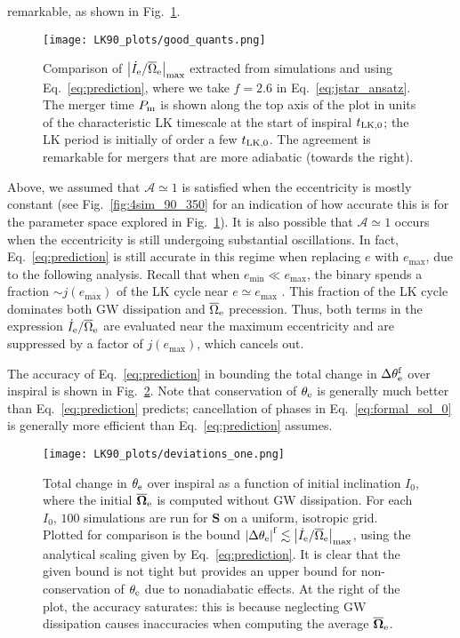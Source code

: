\documentclass[
        twocolumn,
        twocolappendix
    ]{aastex63}
\newcommand*{\abs}[1]{\left|#1\right|}
\renewcommand*{\bm}[1]{\boldsymbol{\mathbf{#1}}}
\begin{document}
remarkable, as shown in Fig.~\ref{fig:good_quants}.
\begin{figure}
    \centering
    \texttt{[image: LK90\_plots/good\_quants.png]}
    \caption{Comparison of $\abs{\dot{I}_{\rm e} /
    \overline{\Omega}_{\rm e}}_{\max}$ extracted from simulations and using
    Eq.~\eqref{eq:prediction}, where we take $f = 2.6$ in
    Eq.~\eqref{eq:jstar_ansatz}. The merger time $P_{\rm m}$ is shown along the
    top axis of the plot in units of the characteristic LK timescale at the
    start of inspiral $t_{\rm LK, 0}$; the LK period is initially of order a few
    $t_{\rm LK, 0}$. The agreement is remarkable for mergers that are more
    adiabatic (towards the right).}\label{fig:good_quants}
\end{figure}

Above, we assumed that $\mathcal{A} \simeq 1$ is satisfied when the eccentricity
is mostly constant (see Fig.~\ref{fig:4sim_90_350} for an indication of how
accurate this is for the parameter space explored in
Fig.~\ref{fig:good_quants}). It is also possible that $\mathcal{A} \simeq 1$
occurs when the eccentricity is still undergoing substantial oscillations. In
fact, Eq.~\eqref{eq:prediction} is still accurate in this regime when replacing
$e$ with $e_{\max}$, due to the following analysis. Recall that when $e_{\min}
\ll e_{\max}$, the binary spends a fraction $\sim j(e_{\max})$ of the LK cycle
near $e \simeq e_{\max}$ \citep{anderson2016formation}. This fraction of the LK
cycle dominates both GW dissipation and $\overline{\Omega}_{\rm e}$ precession.
Thus, both terms in the expression $\dot{I}_{\rm e} / \overline{\Omega}_{\rm e}$
are evaluated near the maximum eccentricity and are suppressed by a factor
of $j(e_{\max})$, which cancels out.

The accuracy of Eq.~\eqref{eq:prediction} in bounding the total change in
$\Delta \theta_{\rm e}^{\rm f}$ over inspiral is shown in
Fig.~\ref{fig:deviations}. Note that conservation of $\theta_{\rm e}$ is
generally much better than Eq.~\eqref{eq:prediction} predicts; cancellation of
phases in Eq.~\eqref{eq:formal_sol_0} is generally more efficient than
Eq.~\eqref{eq:prediction} assumes.
\begin{figure}
    \centering
    \texttt{[image: LK90\_plots/deviations\_one.png]}
    \caption{Total change in $\theta_{\rm e}$ over inspiral as a function of
    initial inclination $I_0$, where the initial $\bm{\overline{\Omega}}_{\rm
    e}$ is computed without GW dissipation. For each $I_0$, $100$ simulations
    are run for $\bm{S}$ on a uniform, isotropic grid. Plotted for comparison is
    the bound $\abs{\Delta \theta_{\rm e}}^{\rm f} \lesssim \abs{\dot{I}_{\rm e} /
    \overline{\Omega}_{\rm e}}_{\max}$, using the analytical scaling given by
    Eq.~\eqref{eq:prediction}. It is clear that the given bound is not tight but
    provides an upper bound for non-conservation of $\theta_{\rm e}$ due to
    nonadiabatic effects. At the right of the plot, the accuracy saturates: this
    is because neglecting GW dissipation causes inaccuracies when computing the
    average $\bm{\overline{\Omega}}_{\rm e}$.}\label{fig:deviations}
\end{figure}
\end{document}
